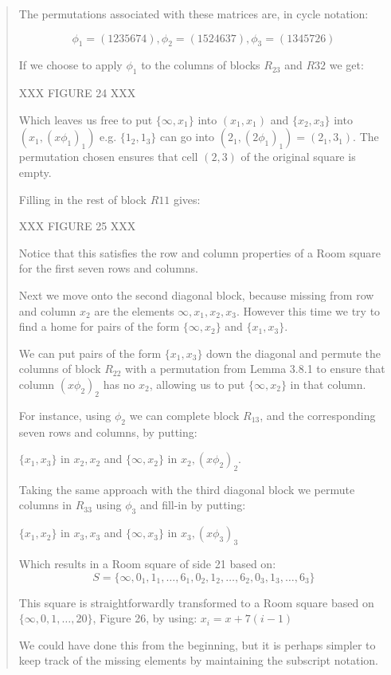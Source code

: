 \documentclass[
  11pt,
  a4paper]{book}
\begin{document}
\begin{quote}
The permutations associated with these matrices are, in
cycle notation:

\begin{equation}
\phi _1 = (1235674), \phi _2 = (1524637), \phi _3 = (1345726)
\end{equation}

If we choose to apply $\phi _1$ to the columns of blocks
$R_{23}$ and $R{32}$ we get:

XXX FIGURE 24 XXX

Which leaves us free to put $\{\infty, x_1\}$ into
$(x_1, x_1)$ and $\{x_2, x_3\}$ into $(x_1, (x\phi _1)_1)$
e.g. $\{1_2, 1_3\}$ can go into
$(2_1, (2\phi _1)_1) = (2_1,3_1)$.
The permutation chosen ensures that cell $(2, 3)$ of the
original square is empty.

Filling in the rest of block $R11$ gives:

XXX FIGURE 25 XXX

Notice that this satisfies the row and column properties of
a Room square for the first seven rows and columns.

Next we move onto the second diagonal block, because missing
from row and column $x_2$ are the elements
$\infty, x_1, x_2, x_3$. However this time we try to find
a home for pairs of the form $\{\infty, x_2\}$ and
$\{x_1, x_3\}$.

We can put pairs of the form $\{x_1, x_3\}$ down the diagonal
and permute the columns of block $R_{22}$ with a permutation
from Lemma 3.8.1 to ensure that column $(x\phi _2)_2$ has no
$x_2$, allowing us to put $\{\infty, x_2\}$ in that column.

For instance, using $\phi _2$ we can complete block
$R_{13}$, and the corresponding seven rows and columns, by
putting:

$\{x_1, x_3\}$ in $x_2, x_2$ and $\{\infty, x_2\}$ in
$x_2,(x \phi _2)_2$.

Taking the same approach with the third diagonal block we
permute columns in $R_{33}$ using $\phi _3$ and fill-in by
putting:

$\{x_1, x_2\}$ in $x_3, x_3$ and $\{\infty, x_3\}$ in
$x_3, (x \phi _3)_3$

Which results in a Room square of side 21 based on:
$$S = \{\infty, 0_1, 1_1, \ldots, 6_1, 0_2, 1_2, \ldots, 6_2, 0_3, 1_3, \ldots, 6_3\}$$

This square is straightforwardly transformed to a Room
square based on $\{\infty, 0, 1, \ldots, 20\}$, Figure 26,
by using: $x_i = x + 7(i - 1)$

We could have done this from the beginning, but it is
perhaps simpler to keep track of the missing elements by
maintaining the subscript notation.
 \end{quote}
\end{document}
